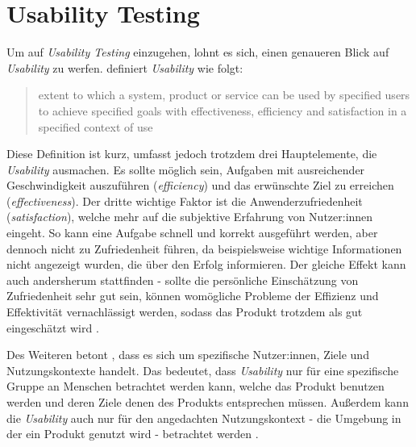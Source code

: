 \section{Usability Testing}
\label{sec:usability}

Um auf \textit{Usability Testing} einzugehen, lohnt es sich, einen genaueren Blick auf \textit{Usability} zu werfen.  definiert \textit{Usability} wie folgt:
\begin{quote}
  extent to which a system, product or service can be used by specified users to achieve specified goals with effectiveness, efficiency and satisfaction in a specified context of use
  \hspace*{\fill{}}
\end{quote}
Diese Definition ist kurz, umfasst jedoch trotzdem drei Hauptelemente, die \textit{Usability} ausmachen. Es sollte möglich sein, Aufgaben mit ausreichender Geschwindigkeit auszuführen (\textit{efficiency}) und das erwünschte Ziel zu erreichen (\textit{effectiveness}). Der dritte wichtige Faktor ist die Anwenderzufriedenheit (\textit{satisfaction}), welche mehr auf die subjektive Erfahrung von Nutzer:innen eingeht. So kann eine Aufgabe schnell und korrekt ausgeführt werden, aber dennoch nicht zu Zufriedenheit führen, da beispielsweise wichtige Informationen nicht angezeigt wurden, die über den Erfolg informieren. Der gleiche Effekt kann auch andersherum stattfinden - sollte die persönliche Einschätzung von Zufriedenheit sehr gut sein, können womögliche Probleme der Effizienz und Effektivität vernachlässigt werden, sodass das Produkt trotzdem als gut eingeschätzt wird \parencite{barnumUsabilityTesting2021}.

Des Weiteren betont \citeauthor{barnumUsabilityTesting2021}, dass es sich um spezifische Nutzer:innen, Ziele und Nutzungskontexte handelt. Das bedeutet, dass \textit{Usability} nur für eine spezifische Gruppe an Menschen betrachtet werden kann, welche das Produkt benutzen werden und deren Ziele denen des Produkts entsprechen müssen. Außerdem kann die \textit{Usability} auch nur für den angedachten Nutzungskontext - die Umgebung in der ein Produkt genutzt wird - betrachtet werden \parencite{barnumUsabilityTesting2021}.

